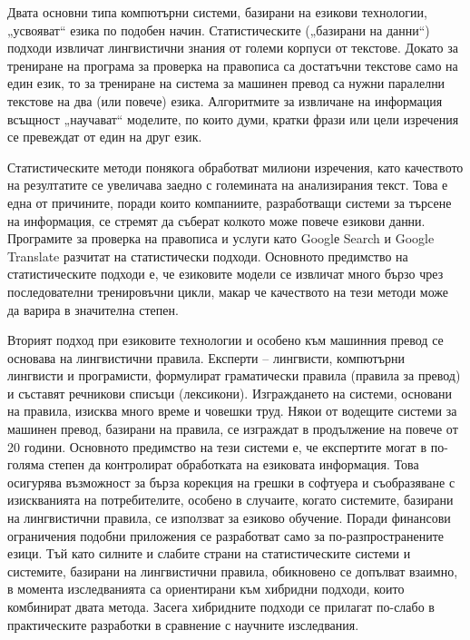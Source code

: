 \documentclass[]{../../metanetpaper}
\begin{document}
\begin{multicols}{2}

Двата основни типа компютърни системи, базирани на езикови технологии, „усвояват“ езика по подобен начин. Статистическите („базирани на данни“) подходи извличат
 лингвистични знания от големи корпуси от текстове. Докато  за трениране на програма за проверка на правописа са достатъчни текстове само на един език, то за трениране на система за машинен превод са нужни паралелни текстове на два (или повече) езика. Алгоритмите за извличане на информация всъщност „научават“ моделите, по които думи, кратки
 фрази или цели изречения се превеждат от един на друг език. 

Статистическите методи понякога обработват милиони изречения, като качеството на резултатите се увеличава заедно с големината на анализирания
 текст. Това е една от причините, поради които компаниите, разработващи системи за търсене на информация, се стремят да съберат колкото
 може повече езикови данни. Програмите за проверка на
 правописа и услуги като Googlе Search и Google Translate разчитат на статистически подходи. Основното предимство на статистическите подходи е, че езиковите модели се извличат много бързо чрез последователни тренировъчни цикли, макар че качеството на тези методи може да варира в значителна степен.

Вторият подход при езиковите технологии и особено към машинния превод се основава на лингвистични правила. Експерти -- лингвисти, компютърни лингвисти и програмисти, формулират  граматически правила (правила за превод) и съставят
 речникови списъци (лексикони). Изграждането на системи, основани на правила, изисква много време и човешки труд. 
Някои от водещите системи за машинен превод, базирани на правила, се
 изграждат в продължение на повече от 20 години. Основното предимство
 на тези системи е, че експертите могат в по-голяма степен да контролират обработката на езиковата информация. 
Това осигурява възможност за бърза корекция на грешки в софтуера и
съобразяване с изискванията на потребителите, особено в случаите, когато системите, базирани на лингвистични правила, се използват за езиково обучение.
Поради финансови ограничения подобни приложения се разработват само за
по-разпространените езици.
%
Тъй като силните и слабите страни на статистическите системи и системите, базирани на лингвистични правила, обикновено се допълват взаимно, в момента изследванията са ориентирани към хибридни подходи, които комбинират  двата метода. Засега хибридните подходи се прилагат по-слабо в практическите разработки в сравнение с научните изследвания. 


\end{multicols}
\end{document}
